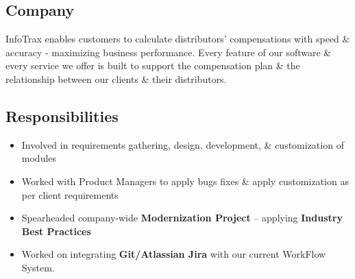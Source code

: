 \documentclass[letterpaper,9pt]{article}
\begin{document}
    \subsection{Company}
    InfoTrax enables customers to calculate distributors’ compensations with speed \& accuracy - maximizing business performance. Every feature of our software \& every service we offer is built to support the compensation plan \& the relationship between our clients \& their distributors.

    \subsection{Responsibilities}
    \begin{itemize}[itemsep=0.5em]
	    \item Involved in requirements gathering, design, development, \& customization of modules
	    \item Worked with Product Managers to apply bugs fixes \& apply customization as per client requirements
	    \item Spearheaded company-wide \textbf{\color{black}Modernization Project} – applying \textbf{\color{black}Industry Best Practices}
	    \item Worked on integrating \textbf{\color{black}Git/Atlassian Jira} with our current WorkFlow System.
	\end{itemize}

    \pagebreak

\end{document}
